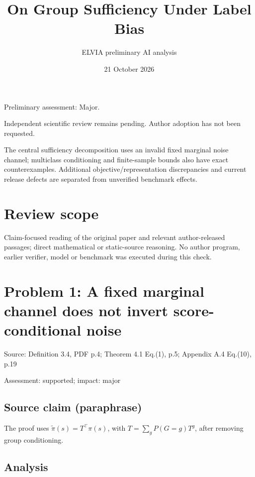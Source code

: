 \documentclass[11pt]{article}
\begin{document}
\title{On Group Sufficiency Under Label Bias}

\author{ELVIA preliminary AI analysis}\date{21 October 2026}\maketitle

Preliminary assessment: Major.\par

Independent scientific review remains pending. Author adoption has not been requested.

The central sufficiency decomposition uses an invalid fixed marginal noise channel; multiclass conditioning and finite-sample bounds also have exact counterexamples. Additional objective/representation discrepancies and current release defects are separated from unverified benchmark effects.

\section*{Review scope}

Claim-focused reading of the original paper and relevant author-released passages; direct mathematical or static-source reasoning. No author program, earlier verifier, model or benchmark was executed during this check.

\section*{Problem 1: A fixed marginal channel does not invert score-conditional noise}

Source: Definition 3.4, PDF p.4; Theorem 4.1 Eq.(1), p.5; Appendix A.4 Eq.(10), p.19

Assessment: supported; impact: major

\subsection*{Source claim (paraphrase)}

The proof uses \(\widetilde\pi(s)=T^\top\pi(s)\), with \(T=\sum_gP(G=g)T^g\), after removing group conditioning.

\subsection*{Analysis}
\end{document}
